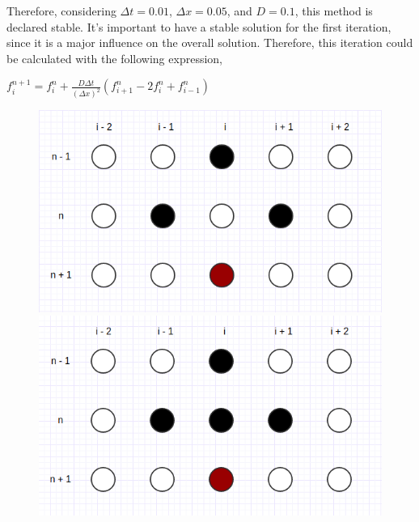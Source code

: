 \documentclass[12pt]{report}
\begin{document}
Therefore, considering $\Delta t = 0.01$, $\Delta x = 0.05$, and $D = 0.1$, this method is declared stable. It's important to have a stable solution for the first iteration, since it is a major influence on the overall solution. Therefore, this iteration could be calculated with the following expression,

\begin{center}
\Large
$
f_{i}^{n + 1} = f_{i}^{n} + \frac{D \Delta t}{(\Delta x)^2}(f_{i + 1}^{n} - 2f_{i}^{n} + f_{i - 1}^{n})
$
\end{center}

\begin{figure}[!htb]
\centering
\begin{minipage}{.5\textwidth}
  \centering
  \includegraphics[width=.8\linewidth]{richardson.png}
\end{minipage}%
\begin{minipage}{.5\textwidth}
  \centering
  \includegraphics[width=.8\linewidth]{dufort-frankel.png}
\end{minipage}
\end{figure}
\end{document}

